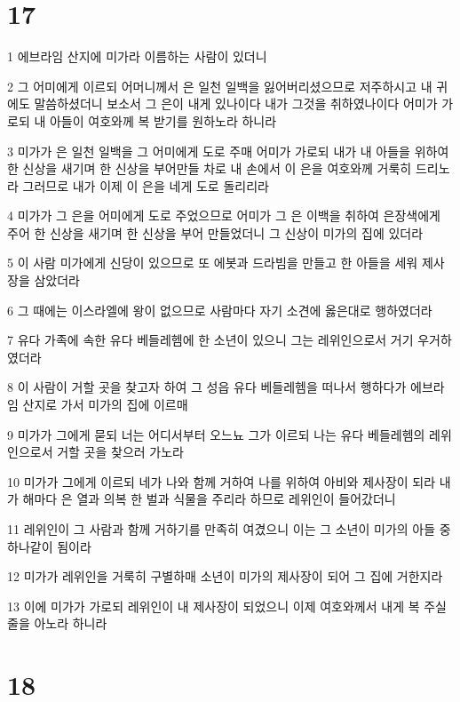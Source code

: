 \chapter{17}

\par 1 에브라임 산지에 미가라 이름하는 사람이 있더니
\par 2 그 어미에게 이르되 어머니께서 은 일천 일백을 잃어버리셨으므로 저주하시고 내 귀에도 말씀하셨더니 보소서 그 은이 내게 있나이다 내가 그것을 취하였나이다 어미가 가로되 내 아들이 여호와께 복 받기를 원하노라 하니라
\par 3 미가가 은 일천 일백을 그 어미에게 도로 주매 어미가 가로되 내가 내 아들을 위하여 한 신상을 새기며 한 신상을 부어만들 차로 내 손에서 이 은을 여호와께 거룩히 드리노라 그러므로 내가 이제 이 은을 네게 도로 돌리리라
\par 4 미가가 그 은을 어미에게 도로 주었으므로 어미가 그 은 이백을 취하여 은장색에게 주어 한 신상을 새기며 한 신상을 부어 만들었더니 그 신상이 미가의 집에 있더라
\par 5 이 사람 미가에게 신당이 있으므로 또 에봇과 드라빔을 만들고 한 아들을 세워 제사장을 삼았더라
\par 6 그 때에는 이스라엘에 왕이 없으므로 사람마다 자기 소견에 옳은대로 행하였더라
\par 7 유다 가족에 속한 유다 베들레헴에 한 소년이 있으니 그는 레위인으로서 거기 우거하였더라
\par 8 이 사람이 거할 곳을 찾고자 하여 그 성읍 유다 베들레헴을 떠나서 행하다가 에브라임 산지로 가서 미가의 집에 이르매
\par 9 미가가 그에게 묻되 너는 어디서부터 오느뇨 그가 이르되 나는 유다 베들레헴의 레위인으로서 거할 곳을 찾으러 가노라
\par 10 미가가 그에게 이르되 네가 나와 함께 거하여 나를 위하여 아비와 제사장이 되라 내가 해마다 은 열과 의복 한 벌과 식물을 주리라 하므로 레위인이 들어갔더니
\par 11 레위인이 그 사람과 함께 거하기를 만족히 여겼으니 이는 그 소년이 미가의 아들 중 하나같이 됨이라
\par 12 미가가 레위인을 거룩히 구별하매 소년이 미가의 제사장이 되어 그 집에 거한지라
\par 13 이에 미가가 가로되 레위인이 내 제사장이 되었으니 이제 여호와께서 내게 복 주실 줄을 아노라 하니라

\chapter{18}

